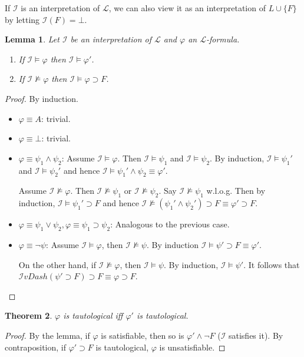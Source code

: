 \documentclass[a4paper,10pt]{article}
\newcommand{\imp}{\supset}
\newcommand{\I}{\mathcal{I}}
\renewcommand{\L}{\mathcal{L}}
\newtheorem{theorem}{Theorem}
\newtheorem{lemma}[theorem]{Lemma}
\theoremstyle{definition}
\begin{document}
If $\I$ is an interpretation of $\L$, we can also view it as an interpretation of $L \cup \{F\}$ by letting $\I(F) = \bot$.
\begin{lemma}
 Let $\I$ be an interpretation of $\L$ and $φ$ an $\L$-formula.
 \begin{enumerate}
  \item If $\I \vDash φ$ then $\I \vDash φ'$.
  \item If $\I \not\vDash φ$ then $\I \vDash φ \imp F$.
 \end{enumerate}
\end{lemma}
\begin{proof}
 By induction.
 \begin{itemize}
  \item $φ \equiv A$: trivial.
  \item $φ \equiv \bot$: trivial.
  \item $φ \equiv ψ_1 ∧ ψ_2$: Assume $\I \vDash φ$. Then $\I \vDash ψ_1$ and $\I \vDash ψ_2$. By induction, $\I \vDash ψ_1'$ and $\I \vDash ψ_2'$ and hence $\I \vDash ψ_1' ∧ ψ_2 \equiv φ'$.
  
  Assume $\I \not \vDash φ$. Then $\I \not \vDash ψ_1$ or $\I \not \vDash ψ_2$. Say $\I \not \vDash ψ_1$ w.l.o.g. Then by induction, $\I \vDash ψ_1' \imp F$ and hence $\I \not \vDash (ψ_1' ∧ ψ_2') \imp F \equiv φ' \imp F$.
  \item $φ \equiv ψ_1 ∨ ψ_2, φ \equiv ψ_1 \imp ψ_2$: Analogous to the previous case.
  \item $φ \equiv ¬ ψ$: Assume $\I \vDash φ$, then $\I \not \vDash ψ$. By induction $\I \vDash ψ' \imp F \equiv φ'$.
  
  On the other hand, if $\I \not \vDash φ$, then $\I \vDash ψ$. By induction, $\I \vDash ψ'$. It follows that $\I vDash (ψ' \imp F) \imp F \equiv φ \imp F$.
 \end{itemize}
\end{proof}
\begin{theorem}
 $φ$ is tautological iff $φ'$ is tautological.
\end{theorem}
\begin{proof}
 By the lemma, if $φ$ is satisfiable, then so is $φ' ∧ ¬F$ ($\I$ satisfies it). By contraposition, if $φ' \imp F$ is tautological, $φ$ is unsatisfiable.
\end{proof}
\end{document}
